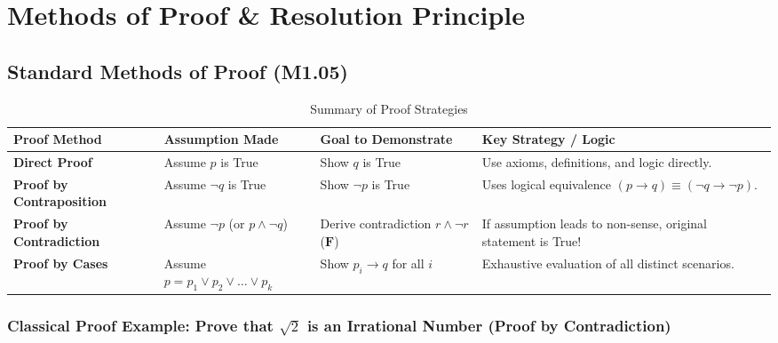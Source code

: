 \documentclass[11pt,a4paper]{article}
\begin{document}
\section{Methods of Proof \& Resolution Principle}

\subsection{Standard Methods of Proof (M1.05)}

\begin{table}[htbp]
\centering
\small
\begin{tabularx}{\textwidth}{|l|X|X|X|}
\hline
\rowcolor{primaryblue} \color{white}\textbf{Proof Method} & \color{white}\textbf{Assumption Made} & \color{white}\textbf{Goal to Demonstrate} & \color{white}\textbf{Key Strategy / Logic} \\ \hline
\textbf{Direct Proof} & Assume $p$ is True & Show $q$ is True & Use axioms, definitions, and logic directly. \\ \hline
\textbf{Proof by Contraposition} & Assume $\neg q$ is True & Show $\neg p$ is True & Uses logical equivalence $(p \rightarrow q) \equiv (\neg q \rightarrow \neg p)$. \\ \hline
\textbf{Proof by Contradiction} & Assume $\neg p$ (or $p \land \neg q$) & Derive contradiction $r \land \neg r$ ($\mathbf{F}$) & If assumption leads to non-sense, original statement is True! \\ \hline
\textbf{Proof by Cases} & Assume $p = p_1 \lor p_2 \lor \dots \lor p_k$ & Show $p_i \rightarrow q$ for all $i$ & Exhaustive evaluation of all distinct scenarios. \\ \hline
\end{tabularx}
\caption{Summary of Proof Strategies}
\end{table}

\subsubsection*{Classical Proof Example: Prove that $\sqrt{2}$ is an Irrational Number (Proof by Contradiction)}
\end{document}
